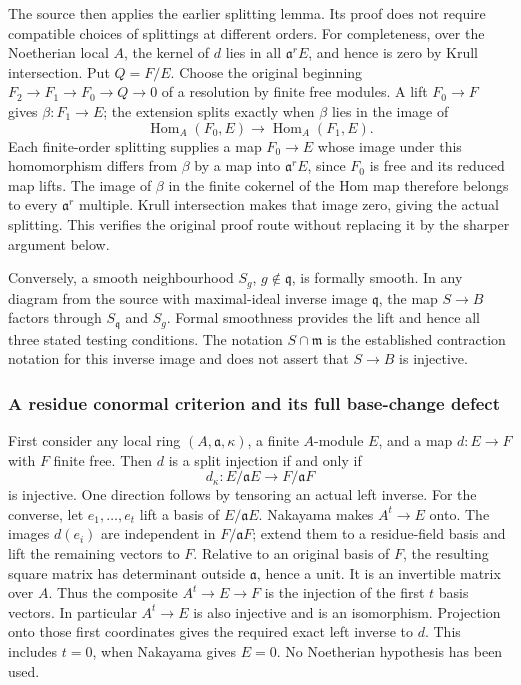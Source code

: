The source then applies the earlier splitting lemma. Its proof does not require compatible choices of splittings at different orders. For completeness, over the Noetherian local \(A\), the kernel of \(d\) lies in all \(\mathfrak a^rE\), and hence is zero by Krull intersection. Put \(Q=F/E\). Choose the original beginning \(F_2\to F_1\to F_0\to Q\to0\) of a resolution by finite free modules. A lift \(F_0\to F\) gives \(\beta:F_1\to E\); the extension splits exactly when \(\beta\) lies in the image of \[
\operatorname{Hom}_A(F_0,E)\longrightarrow\operatorname{Hom}_A(F_1,E).
\] Each finite-order splitting supplies a map \(F_0\to E\) whose image under this homomorphism differs from \(\beta\) by a map into \(\mathfrak a^rE\), since \(F_0\) is free and its reduced map lifts. The image of \(\beta\) in the finite cokernel of the Hom map therefore belongs to every \(\mathfrak a^r\) multiple. Krull intersection makes that image zero, giving the actual splitting. This verifies the original proof route without replacing it by the sharper argument below.

Conversely, a smooth neighbourhood \(S_g\), \(g\notin\mathfrak q\), is formally smooth. In any diagram from the source with maximal-ideal inverse image \(\mathfrak q\), the map \(S\to B\) factors through \(S_{\mathfrak q}\) and \(S_g\). Formal smoothness provides the lift and hence all three stated testing conditions. The notation \(S\cap\mathfrak m\) is the established contraction notation for this inverse image and does not assert that \(S\to B\) is injective.

\subsubsection{A residue conormal criterion and its full base-change defect}\label{algebra-proof-050-a-residue-conormal-criterion-and-its-full-base-change-defect}

First consider any local ring \((A,\mathfrak a,\kappa)\), a finite \(A\)-module \(E\), and a map \(d:E\to F\) with \(F\) finite free. Then \(d\) is a split injection if and only if \[
d_\kappa:E/\mathfrak aE\longrightarrow F/\mathfrak aF
\] is injective. One direction follows by tensoring an actual left inverse. For the converse, let \(e_1,\ldots,e_t\) lift a basis of \(E/\mathfrak aE\). Nakayama makes \(A^t\to E\) onto. The images \(d(e_i)\) are independent in \(F/\mathfrak aF\); extend them to a residue-field basis and lift the remaining vectors to \(F\). Relative to an original basis of \(F\), the resulting square matrix has determinant outside \(\mathfrak a\), hence a unit. It is an invertible matrix over \(A\). Thus the composite \(A^t\to E\to F\) is the injection of the first \(t\) basis vectors. In particular \(A^t\to E\) is also injective and is an isomorphism. Projection onto those first coordinates gives the required exact left inverse to \(d\). This includes \(t=0\), when Nakayama gives \(E=0\). No Noetherian hypothesis has been used.


